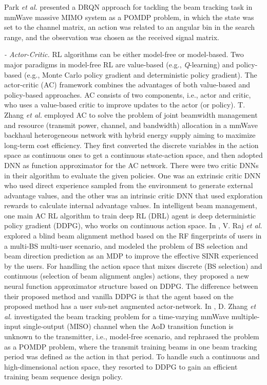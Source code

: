 \documentclass[journal,comsoc]{IEEEtran}
\begin{document}
Park \emph{et al.} \cite{Deep-Recurrent-Q-Network-Beam-Tracking-2022} presented a DRQN approach for tackling the beam tracking task in mmWave massive MIMO system as a POMDP problem, in which the state was set to the channel matrix, an action was related to an angular bin in the search range, and the observation was chosen as the received signal matrix.


\emph{- Actor-Critic.} RL algorithms can be either model-free or model-based. Two major paradigms in model-free RL are value-based (e.g., \emph{Q}-learning) and policy-based (e.g., Monte Carlo policy gradient and deterministic policy gradient). The actor-critic (AC) framework combines the advantages of both value-based and policy-based approaches. AC consists of two components, i.e., actor and critic, who uses a value-based critic to improve updates to the actor (or policy). T. Zhang \emph{et al.} \cite{Cost-Efficient-Beam-Management-Resource-Allocation-2022} employed AC to solve the problem of joint beamwidth management and resource (transmit power, channel, and bandwidth) allocation in a mmWave backhaul heterogeneous network with hybrid energy supply aiming to maximize long-term cost efficiency. They first converted the discrete variables in the action space as continuous ones to get a continuous state-action space, and then adopted DNN as function approximator for the AC network. There were two critic DNNs in their algorithm to evaluate the given policies. One was an extrinsic critic DNN who used direct experience sampled from the environment to generate external advantage values, and the other was an intrinsic critic DNN that used exploration rewards to calculate internal advantage values. In intelligent beam management, one main AC RL algorithm to train deep RL (DRL) agent is deep deterministic policy gradient (DDPG), who works on continuous action space. In \cite{Deep-Reinforcement-Learning-Blind-Alignment-2022}, V. Raj \emph{et al.} explored a blind beam alignment method based on the RF fingerprints of users in a multi-BS multi-user scenario, and modeled the problem of BS selection and beam direction prediction as an MDP to improve the effective SINR experienced by the users. For handling the action space that mixes discrete (BS selection) and continuous (selection of beam alignment angles) actions, they proposed a new neural function approximator structure based on DDPG. The difference between their proposed method and vanilla DDPG is that the agent based on the proposed method has a user sub-net augmented actor-network. In \cite{Training-Beam-Sequence-Design-2022}, D. Zhang \emph{et al.} investigated the beam tracking problem for a time-varying mmWave multiple-input single-output (MISO) channel when the AoD transition function is unknown to the transmitter, i.e., model-free scenario, and rephrased the problem as a POMDP problem, where the transmit training beams in one beam tracking period was defined as the action in that period. To handle such a continuous and high-dimensional action space, they resorted to DDPG to gain an efficient training beam sequence design policy.
\end{document}
